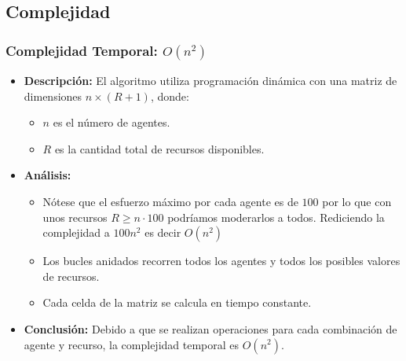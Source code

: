 \documentclass[letterpaper,10pt]{article}
\begin{document}
\subsection{Complejidad}
\subsubsection{Complejidad Temporal: $O(n^2)$}
\begin{itemize}
    \item \textbf{Descripción:} El algoritmo utiliza programación dinámica con una matriz de dimensiones \(n \times (R + 1)\), donde:
    \begin{itemize}
        \item \(n\) es el número de agentes.
        \item \(R\) es la cantidad total de recursos disponibles.
    \end{itemize}
    
    \item \textbf{Análisis:}
    \begin{itemize}
        \item Nótese que el esfuerzo máximo por cada agente es de $100$ por lo que con unos recursos $R \geqslant n \cdot 100$ podríamos moderarlos a todos. Rediciendo la complejidad a $100n^2$ es decir $O(n^2)$
        \item Los bucles anidados recorren todos los agentes y todos los posibles valores de recursos.
        \item Cada celda de la matriz se calcula en tiempo constante.
    \end{itemize}
    
    \item \textbf{Conclusión:} Debido a que se realizan operaciones para cada combinación de agente y recurso, la complejidad temporal es \(O(n^2)\).
\end{itemize}
\end{document}
